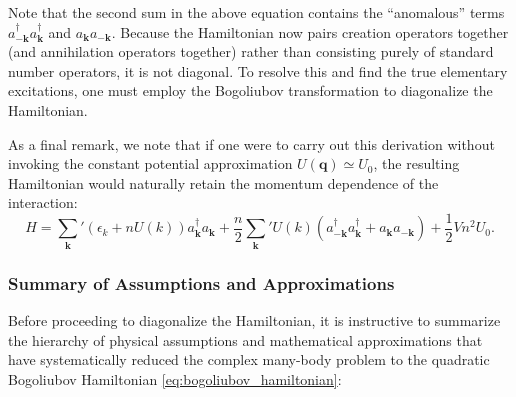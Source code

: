 Note that the second sum in the above equation contains the ``anomalous'' terms \( a_{-\mathbf{k}}^\dagger a_{\mathbf{k}}^\dagger \) and \( a_{\mathbf{k}} a_{-\mathbf{k}} \). Because the Hamiltonian now pairs creation operators together (and annihilation operators together) rather than consisting purely of standard number operators, it is not diagonal. To resolve this and find the true elementary excitations, one must employ the Bogoliubov transformation to diagonalize the Hamiltonian.

As a final remark, we note that if one were to carry out this derivation without invoking the constant potential approximation \( U(\mathbf{q}) \simeq U_0 \), the resulting Hamiltonian would naturally retain the momentum dependence of the interaction:
\[
    H = \sum_{\mathbf{k}}' (\epsilon_k + nU(k)) a_{\mathbf{k}}^\dagger a_{\mathbf{k}} + \frac{n}{2} \sum_{\mathbf{k}}' U(k) (a_{-\mathbf{k}}^\dagger a_{\mathbf{k}}^\dagger + a_{\mathbf{k}} a_{-\mathbf{k}}) + \frac{1}{2}V n^2 U_0.
\]

\subsubsection{Summary of Assumptions and Approximations}

Before proceeding to diagonalize the Hamiltonian, it is instructive to summarize the hierarchy of physical assumptions and mathematical approximations that have systematically reduced the complex many-body problem to the quadratic Bogoliubov Hamiltonian \eqref{eq:bogoliubov_hamiltonian}:

